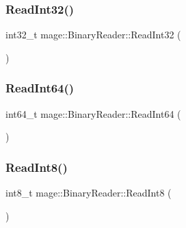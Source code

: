 \hypertarget{classmage_1_1_binary_reader_a8a463e4e5469e90246a40f2898abbc67}{}\label{classmage_1_1_binary_reader_a8a463e4e5469e90246a40f2898abbc67} 
\subsubsection{\texorpdfstring{Read\+Int32()}{ReadInt32()}}
{\footnotesize\ttfamily int32\+\_\+t mage\+::\+Binary\+Reader\+::\+Read\+Int32 (\begin{DoxyParamCaption}{ }\end{DoxyParamCaption})\hspace{0.3cm}{\ttfamily [protected]}}

\hypertarget{classmage_1_1_binary_reader_a404b0bdd39f4f1cd52cb8360896ac851}{}\label{classmage_1_1_binary_reader_a404b0bdd39f4f1cd52cb8360896ac851} 
\subsubsection{\texorpdfstring{Read\+Int64()}{ReadInt64()}}
{\footnotesize\ttfamily int64\+\_\+t mage\+::\+Binary\+Reader\+::\+Read\+Int64 (\begin{DoxyParamCaption}{ }\end{DoxyParamCaption})\hspace{0.3cm}{\ttfamily [protected]}}

\hypertarget{classmage_1_1_binary_reader_abfc9296a42190b21ad0ddb6e0ea119af}{}\label{classmage_1_1_binary_reader_abfc9296a42190b21ad0ddb6e0ea119af} 
\subsubsection{\texorpdfstring{Read\+Int8()}{ReadInt8()}}
{\footnotesize\ttfamily int8\+\_\+t mage\+::\+Binary\+Reader\+::\+Read\+Int8 (\begin{DoxyParamCaption}{ }\end{DoxyParamCaption})\hspace{0.3cm}{\ttfamily [protected]}}

